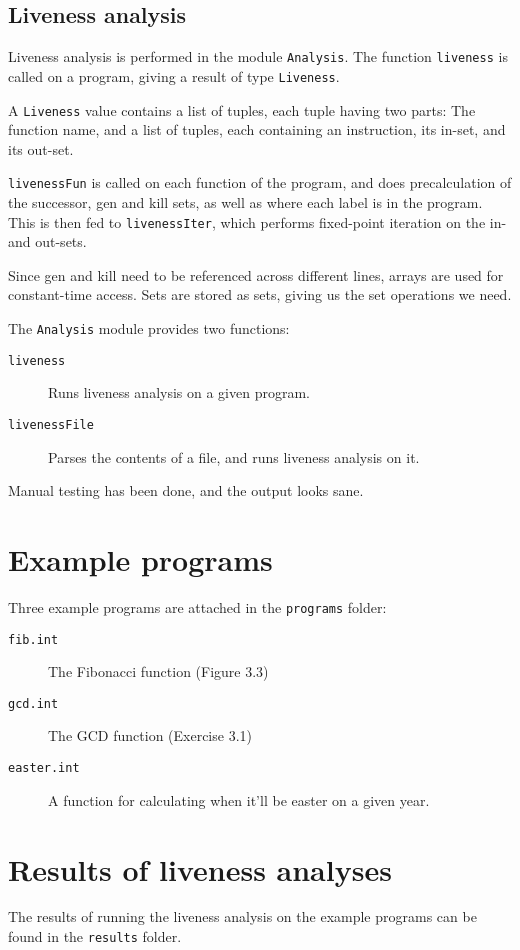 \documentclass[11pt,a4paper]{article}
\begin{document}
\subsection{Liveness analysis}

Liveness analysis is performed in the module \texttt{Analysis}. The
function \texttt{liveness} is called on a program, giving a result of type
\texttt{Liveness}.

A \texttt{Liveness} value contains a list of tuples, each tuple having
two parts: The function name, and a list of tuples, each containing an
instruction, its in-set, and its out-set.

\texttt{livenessFun} is called on each function of the program, and does
precalculation of the successor, gen and kill sets, as well as where each
label is in the program. This is then fed to \texttt{livenessIter}, which
performs fixed-point iteration on the in- and out-sets.

Since gen and kill need to be referenced across different lines, arrays are
used for constant-time access. Sets are stored as sets, giving us the set
operations we need.

The \texttt{Analysis} module provides two functions:

\begin{description}
    \item[\texttt{liveness}] Runs liveness analysis on a given program.
    \item[\texttt{livenessFile}] Parses the contents of a file, and runs liveness analysis on it.
\end{description}

Manual testing has been done, and the output looks sane.

\section{Example programs}
Three example programs are attached in the \texttt{programs} folder:

\begin{description}
    \item[\texttt{fib.int}] The Fibonacci function (Figure 3.3)
    \item[\texttt{gcd.int}] The GCD function (Exercise 3.1)
    \item[\texttt{easter.int}] A function for calculating when it'll be easter on a given year.
\end{description}

\section{Results of liveness analyses}

The results of running the liveness analysis on the example programs can be
found in the \texttt{results} folder.
\end{document}
